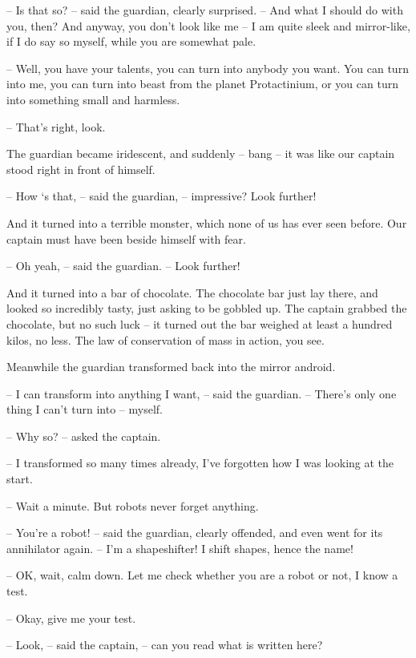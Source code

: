\documentclass[ebook,twoside,final,openright]{memoir}
\begin{document}
– Is that so? – said the guardian, clearly surprised. – And what I should do with you, then? And anyway, you don’t look like me – I am quite sleek and mirror-like, if I do say so myself, while you are somewhat pale.\par
– Well, you have your talents, you can turn into anybody you want. You can turn into me, you can turn into beast from the planet Protactinium, or you can turn into something small and harmless.\par
– That's right, look.\par
\par
The guardian became iridescent, and suddenly – bang – it was like our captain stood right in front of himself.\par
– How ‘s that, – said the guardian, – impressive? Look further!\par
And it turned into a terrible monster, which none of us has ever seen before. Our captain must have been beside himself with fear.\par
– Oh yeah, – said the guardian. – Look further!\par
\par
And it turned into a bar of chocolate. The chocolate bar just lay there, and looked so incredibly tasty, just asking to be gobbled up. The captain grabbed the chocolate, but no such luck – it turned out the bar weighed at least a hundred kilos, no less. The law of conservation of mass in action, you see.\par
\par
Meanwhile the guardian transformed back into the mirror android.\par
– I can transform into anything I want, – said the guardian. – There’s only one thing I can’t turn into – myself.\par
– Why so? – asked the captain.\par
– I transformed so many times already, I’ve forgotten how I was looking at the start.\par
– Wait a minute. But robots never forget anything.\par
– You’re a robot! – said the guardian, clearly offended, and even went for its annihilator again. – I’m a shapeshifter! I shift shapes, hence the name!\par
– OK, wait, calm down. Let me check whether you are a robot or not, I know a test.\par
– Okay, give me your test.\par
– Look, – said the captain, – can you read what is written here?\par
\end{document}
